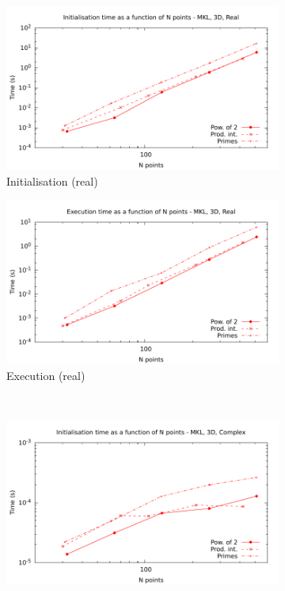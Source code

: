 \documentclass[12pt, a4paper]{article} \setlength{\textheight}{24cm}
\begin{document}
\begin{figure}[H]
  \captionsetup{width=0.8\linewidth}
  \centering
  \begin{subfigure}{.5\textwidth}
    \centering
    \includegraphics[width=.9\linewidth]{graphs/3d-mkl-init-r.pdf}
    \caption{Initialisation (real)}
    \label{3DMKLRI}
  \end{subfigure}%
  \begin{subfigure}{.5\textwidth}
    \centering
    \includegraphics[width=.9\linewidth]{graphs/3d-mkl-exec-r.pdf}
    \caption{Execution (real)}
    \label{3DMKLR}
  \end{subfigure}\\
  \begin{subfigure}{.5\textwidth}
    \centering
    \includegraphics[width=.9\linewidth]{graphs/3d-mkl-init-c.pdf}

\end{subfigure}
\end{figure}
\end{document}
